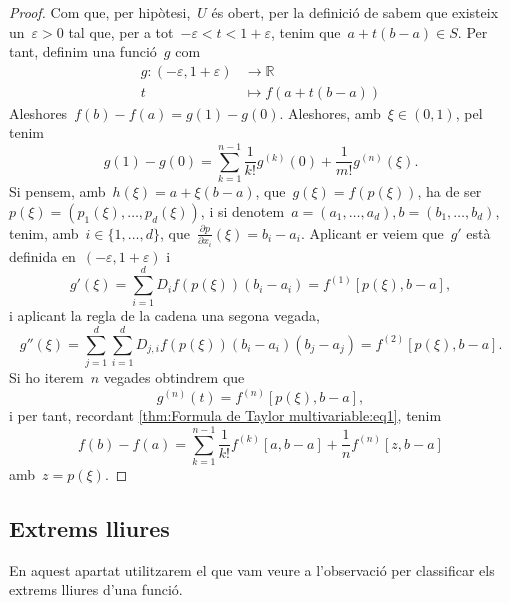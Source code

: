 \documentclass[../../main.tex]{subfiles}
\begin{document}
    \begin{proof}
        Com que, per hipòtesi,~\(U\) és obert, per la definició de  sabem que existeix un~\(\varepsilon>0\) tal que, per a tot~\(-\varepsilon<t<1+\varepsilon\), tenim que~\(a+t(b-a)\in S\).
        Per tant, definim una funció~\(g\) com
        \begin{align*}
        g\colon(-\varepsilon,1+\varepsilon)&\to\mathbb{R}\\
        t&\mapsto f(a+t(b-a))
        \end{align*}
        Aleshores~\(f(b)-f(a)=g(1)-g(0)\).
        Aleshores, amb~\(\xi\in(0,1)\), pel  tenim
        \begin{equation}\label{thm:Formula de Taylor multivariable:eq1}
        g(1)-g(0)=\sum_{k=1}^{n-1}\frac{1}{k!}g^{(k)}(0)+\frac{1}{m!}g^{(n)}(\xi).
        \end{equation}
        Si pensem, amb~\(h(\xi)=a+\xi(b-a)\), que~\(g(\xi)=f(p(\xi))\), ha de ser~\(p(\xi)=(p_{1}(\xi),\dots,p_{d}(\xi))\), i si denotem~\(a=(a_{1},\dots,a_{d}),b=(b_{1},\dots,b_{d})\), tenim, amb~\(i\in\{1,\dots,d\}\), que~\(\frac{\partial p}{\partial x_{i}}(\xi)=b_{i}-a_{i}\).
        Aplicant er  veiem que~\(g'\) està definida en~\((-\varepsilon,1+\varepsilon)\) i
        \[
            g'(\xi)=\sum_{i=1}^{d}D_{i}f(p(\xi))(b_{i}-a_{i})=f^{(1)}[p(\xi),b-a],
        \]
        i aplicant la regla de la cadena una segona vegada,
        \[
            g''(\xi)=\sum_{j=1}^{d}\sum_{i=1}^{d}D_{j,i}f(p(\xi))(b_{i}-a_{i})(b_{j}-a_{j})=f^{(2)}[p(\xi),b-a].
        \]
        Si ho iterem~\(n\) vegades obtindrem que
        \[
            g^{(n)}(t)=f^{(n)}[p(\xi),b-a],
        \]
        i per tant, recordant \eqref{thm:Formula de Taylor multivariable:eq1}, tenim
        \[
            f(b)-f(a)=\sum_{k=1}^{n-1}\frac{1}{k!}f^{(k)}[a,b-a]+\frac{1}{n}f^{(n)}[z,b-a]
        \]
        amb~\(z=p(\xi)\).
    \end{proof}
    \subsection{Extrems lliures}\label{sec:Classificar extrems lliures}
    En aquest apartat utilitzarem el que vam veure a l'observació  per classificar els extrems lliures d'una funció.
\end{document}
